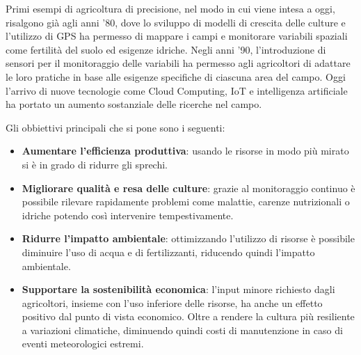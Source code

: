 \documentclass[12pt,a4paper,openright,twoside]{book}
\begin{document}
Primi esempi di agricoltura di precisione, nel modo in cui viene intesa a oggi, risalgono già agli anni '80, dove lo sviluppo di modelli di crescita delle culture e l'utilizzo di \ac{GPS} ha permesso di mappare i campi e monitorare variabili spaziali come fertilità del suolo ed esigenze idriche\cite{201402720190101}.
Negli anni '90, l'introduzione di sensori per il monitoraggio delle variabili ha permesso agli agricoltori di adattare le loro pratiche in base alle esigenze specifiche di ciascuna area del campo\cite{201402720190101}.
Oggi l'arrivo di nuove tecnologie come Cloud Computing, \ac{IoT} e intelligenza artificiale ha portato un aumento sostanziale delle ricerche nel campo\cite{WOLFERT201769}.

Gli obbiettivi principali che si pone sono i seguenti:
\begin{itemize}[noitemsep]
    \item \textbf{Aumentare l'efficienza produttiva}: usando le risorse in modo più mirato si è in grado di ridurre gli sprechi.
    \item \textbf{Migliorare qualità e resa delle culture}: grazie al monitoraggio continuo è possibile rilevare rapidamente problemi come malattie, carenze nutrizionali o idriche potendo così intervenire tempestivamente.
    \item \textbf{Ridurre l'impatto ambientale}: ottimizzando l'utilizzo di risorse è possibile diminuire l'uso di acqua e di fertilizzanti, riducendo quindi l'impatto ambientale.
    \item \textbf{Supportare la sostenibilità economica}: l'input minore richiesto dagli agricoltori, insieme con l'uso inferiore delle risorse, ha anche un effetto positivo dal punto di vista economico. Oltre a rendere la cultura più resiliente a variazioni climatiche, diminuendo quindi costi di manutenzione in caso di eventi meteorologici estremi.
\end{itemize}
\end{document}
